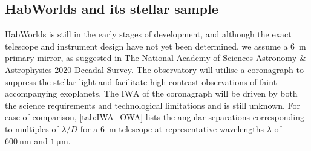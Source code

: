 \documentclass[usenatbib]{mnras}
\newcommand{\IWA}{\ensuremath{\mathrm{IWA}}\xspace}
\newcommand{\HWO}{HabWorlds\xspace}
\begin{document}
\subsection{\HWO and its stellar sample}
\label{subsec:2.1}

\HWO is still in the early stages of development, and although the exact telescope and instrument design have not yet been determined, we assume a \qty{6}{\meter} primary mirror, as suggested in The National Academy of Sciences Astronomy \& Astrophysics 2020 Decadal Survey.
%
The observatory will utilise a coronagraph to suppress the stellar light and facilitate high-contrast observations of faint accompanying exoplanets. 
%
The \IWA of the coronagraph will be driven by both the science requirements and technological limitations and is still unknown.
For ease of comparison, \cref{tab:IWA_OWA} lists the angular separations corresponding to multiples of $\lambda / D$ for a \qty{6}{\meter} telescope at representative wavelengths $\lambda$ of $\qty{600}{\nano\meter}$ and $\qty{1}{\micro\meter}$.
\end{document}
